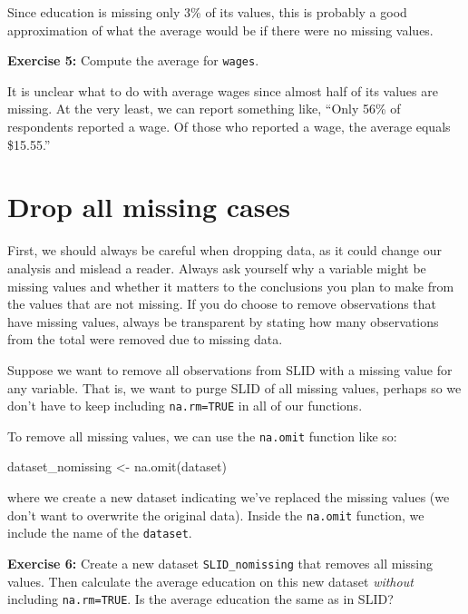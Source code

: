 \documentclass[
]{book}
\makeatletter
\newenvironment{Shaded}{\begin{snugshade}}{\end{snugshade}}
\newcommand{\FunctionTok}[1]{\textcolor[rgb]{0,0,0}{#1}}
\newcommand{\NormalTok}[1]{#1}
\newcommand{\OtherTok}[1]{\textcolor[rgb]{0.37,0.37,0.37}{#1}}
\newenvironment{kframe}{%
\medskip{}
\setlength{\fboxsep}{.8em}
 \def\at@end@of@kframe{}%
 \ifinner\ifhmode%
  \def\at@end@of@kframe{\end{minipage}}%
  \begin{minipage}{\columnwidth}%
 \fi\fi%
 \def\FrameCommand##1{\hskip\@totalleftmargin \hskip-\fboxsep
 \colorbox{shadecolor}{##1}\hskip-\fboxsep
     \hskip-\linewidth \hskip-\@totalleftmargin \hskip\columnwidth}%
 \MakeFramed {\advance\hsize-\width
   \@totalleftmargin\z@ \linewidth\hsize
   \@setminipage}}%
 {\par\unskip\endMakeFramed%
 \at@end@of@kframe}
\renewenvironment{Shaded}{\begin{kframe}}{\end{kframe}}
\newenvironment{rmdblock}[1]
  {\begin{shaded*}
  }
  {\end{shaded*}
  }
\newenvironment{learncheck}
  {\begin{rmdblock}{warning}}
  {\end{rmdblock}}
\makeatother
\begin{document}
Since education is missing only 3\% of its values, this is probably a good approximation of what the average would be if there were no missing values.

\begin{learncheck}
\textbf{Exercise 5:} Compute the average for \texttt{wages}.
\end{learncheck}

It is unclear what to do with average wages since almost half of its values are missing. At the very least, we can report something like, ``Only 56\% of respondents reported a wage. Of those who reported a wage, the average equals \$15.55.''

\hypertarget{drop-all-missing-cases}{%
\section{Drop all missing cases}\label{drop-all-missing-cases}}

First, we should always be careful when dropping data, as it could change our analysis and mislead a reader. Always ask yourself why a variable might be missing values and whether it matters to the conclusions you plan to make from the values that are not missing. If you do choose to remove observations that have missing values, always be transparent by stating how many observations from the total were removed due to missing data.

Suppose we want to remove all observations from SLID with a missing value for any variable. That is, we want to purge SLID of all missing values, perhaps so we don't have to keep including \texttt{na.rm=TRUE} in all of our functions.

To remove all missing values, we can use the \texttt{na.omit} function like so:

\begin{Shaded}
\begin{Highlighting}[]
\NormalTok{dataset\_nomissing }\OtherTok{\textless{}{-}} \FunctionTok{na.omit}\NormalTok{(dataset)}
\end{Highlighting}
\end{Shaded}

where we create a new dataset indicating we've replaced the missing values (we don't want to overwrite the original data). Inside the \texttt{na.omit} function, we include the name of the \texttt{dataset}.

\begin{learncheck}
\textbf{Exercise 6:} Create a new dataset \texttt{SLID\_nomissing} that
removes all missing values. Then calculate the average education on this
new dataset \emph{without} including \texttt{na.rm=TRUE}. Is the average
education the same as in SLID?
\end{learncheck}
\end{document}
